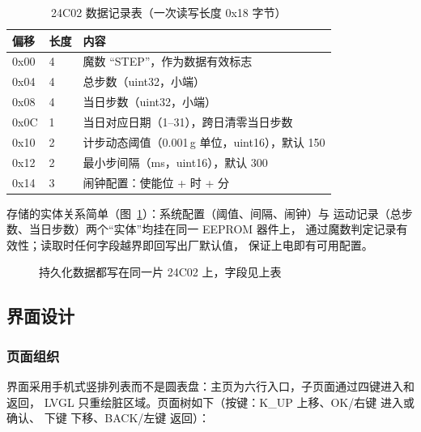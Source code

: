\begin{table}[htbp]
\centering\small
\caption{24C02 数据记录表（一次读写长度 0x18 字节）}\label{tab:ee}
\begin{tabular}{@{}llp{6.9cm}@{}}
\toprule
偏移 & 长度 & 内容\\
\midrule
0x00 & 4 & 魔数 ``STEP''，作为数据有效标志\\
0x04 & 4 & 总步数（uint32，小端）\\
0x08 & 4 & 当日步数（uint32，小端）\\
0x0C & 1 & 当日对应日期（1--31），跨日清零当日步数\\
0x10 & 2 & 计步动态阈值（0.001\,g 单位，uint16），默认 150\\
0x12 & 2 & 最小步间隔（ms，uint16），默认 300\\
0x14 & 3 & 闹钟配置：使能位 + 时 + 分\\
\bottomrule
\end{tabular}
\end{table}

存储的实体关系简单（图~\ref{fig:er}）：系统配置（阈值、间隔、闹钟）与
运动记录（总步数、当日步数）两个``实体''均挂在同一 EEPROM 器件上，
通过魔数判定记录有效性；读取时任何字段越界即回写出厂默认值，
保证上电即有可用配置。

\begin{figure}[htbp]
\centering
{}
\caption{持久化数据都写在同一片 24C02 上，字段见上表}\label{fig:er}
\end{figure}

\subsection{界面设计}
\subsubsection{页面组织}
界面采用手机式竖排列表而不是圆表盘：主页为六行入口，子页面通过四键进入和返回，
LVGL 只重绘脏区域。页面树如下（按键：K\_UP 上移、OK/右键 进入或确认、
下键 下移、BACK/左键 返回）：

